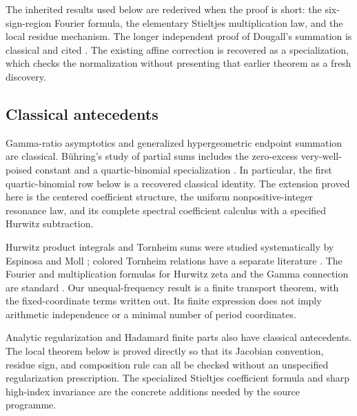 \documentclass[11pt,a4paper]{article}
\numberwithin{equation}{section}
\theoremstyle{definition}
\theoremstyle{remark}
\begin{document}
The inherited results used below are rederived when the proof is short:
the six-sign-region Fourier formula, the elementary Stieltjes
multiplication law, and the local residue mechanism. The longer
independent proof of Dougall's summation is classical and cited
\cite[Eq.~16.4.9]{dlmf-hyper}. The existing affine correction is recovered
as a specialization, which checks the normalization without presenting
that earlier theorem as a fresh discovery.

\subsection{Classical antecedents}
Gamma-ratio asymptotics and generalized hypergeometric endpoint summation
are classical. B\"uhring's study of partial sums includes the zero-excess
very-well-poised constant and a quartic-binomial specialization
\cite[Section 4]{buhring}. In particular, the first quartic-binomial row
below is a recovered classical identity. The extension proved here is
the centered coefficient structure, the uniform nonpositive-integer
resonance law, and its complete spectral coefficient calculus with a
specified Hurwitz subtraction.

Hurwitz product integrals and Tornheim sums were studied systematically
by Espinosa and Moll \cite{em-hurwitz,em-tornheim}; colored Tornheim
relations have a separate literature \cite{zhao}. The Fourier and
multiplication formulas for Hurwitz zeta and the Gamma connection are
standard \cite{dlmf-hurwitz}. Our unequal-frequency result is a finite
transport theorem, with the fixed-coordinate terms written out. Its
finite expression does not imply arithmetic independence or a minimal
number of period coordinates.

Analytic regularization and Hadamard finite parts also have classical
antecedents. The local theorem below is proved directly so that its
Jacobian convention, residue sign, and composition rule can all be
checked without an unspecified regularization prescription. The
specialized Stieltjes coefficient formula and sharp high-index
invariance are the concrete additions needed by the source programme.
\end{document}
